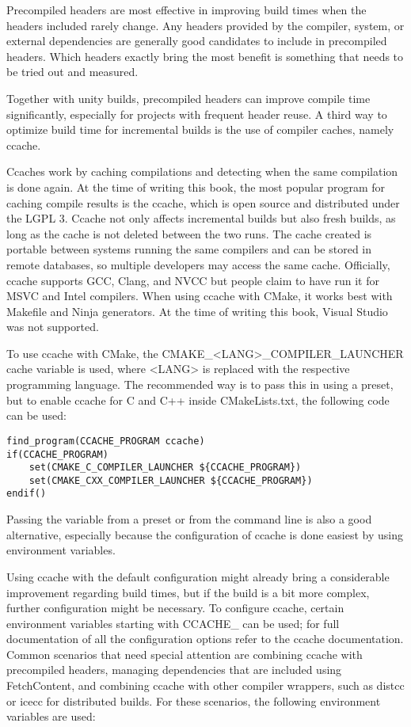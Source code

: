 Precompiled headers are most effective in improving build times when the headers included rarely change. Any headers provided by the compiler, system, or external dependencies are generally good candidates to include in precompiled headers. Which headers exactly bring the most benefit is something that needs to be tried out and measured.

Together with unity builds, precompiled headers can improve compile time significantly, especially for projects with frequent header reuse. A third way to optimize build time for incremental builds is the use of compiler caches, namely ccache.


Ccaches work by caching compilations and detecting when the same compilation is done again. At the time of writing this book, the most popular program for caching compile results is the ccache, which is open source and distributed under the LGPL 3. Ccache not only affects incremental builds but also fresh builds, as long as the cache is not deleted between the two runs. The cache created is portable between systems running the same compilers and can be stored in remote databases, so multiple developers may access the same cache. Officially, ccache supports GCC, Clang, and NVCC but people claim to have run it for MSVC and Intel compilers. When using ccache with CMake, it works best with Makefile and Ninja generators. At the time of writing this book, Visual Studio was not supported.

To use ccache with CMake, the CMAKE\_<LANG>\_COMPILER\_LAUNCHER cache variable is used, where <LANG> is replaced with the respective programming language. The recommended way is to pass this in using a preset, but to enable ccache for C and C++ inside CMakeLists.txt, the following code can be used:

\begin{lstlisting}[style=styleCMake]
find_program(CCACHE_PROGRAM ccache)
if(CCACHE_PROGRAM)
	set(CMAKE_C_COMPILER_LAUNCHER ${CCACHE_PROGRAM})
	set(CMAKE_CXX_COMPILER_LAUNCHER ${CCACHE_PROGRAM})
endif()
\end{lstlisting}

Passing the variable from a preset or from the command line is also a good alternative, especially because the configuration of ccache is done easiest by using environment variables.

Using ccache with the default configuration might already bring a considerable improvement regarding build times, but if the build is a bit more complex, further configuration might be necessary. To configure ccache, certain environment variables starting with CCACHE\_ can be used; for full documentation of all the configuration options refer to the ccache documentation. Common scenarios that need special attention are combining ccache with precompiled headers, managing dependencies that are included using FetchContent, and combining ccache with other compiler wrappers, such as distcc or icecc for distributed builds. For these scenarios, the following environment variables are used:

